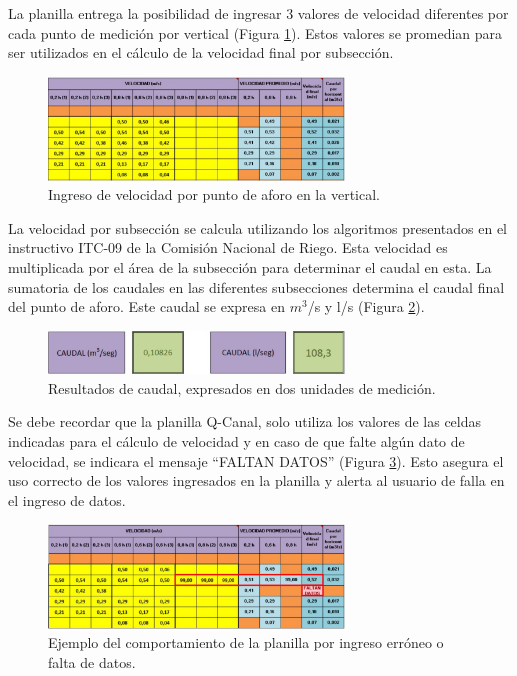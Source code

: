 \documentclass[]{article}
\begin{document}
La planilla entrega la posibilidad de ingresar 3 valores de velocidad diferentes por cada punto de medición por vertical (Figura \ref{ing_veloc}). Estos valores se promedian para ser utilizados en el cálculo de la velocidad final por subsección.

 \begin{figure}[H]
\centering
\includegraphics[width=0.7\textwidth]{images/ingreso_veloc.eps}
\caption{Ingreso de velocidad por punto de aforo en la vertical.}
\label{ing_veloc}
\end{figure}

La velocidad por subsección se calcula utilizando los algoritmos presentados en el instructivo ITC-09 de la Comisión Nacional de Riego. Esta velocidad es multiplicada por el área de la subsección para determinar el caudal en esta. La sumatoria de los caudales en las diferentes subsecciones determina el caudal final del punto de aforo. Este caudal se expresa en $m^3$/s y l/s (Figura \ref{res_q}).\\

\begin{figure}[H]
\centering
\includegraphics[width=0.7\textwidth]{images/caudal.eps}
\caption{Resultados de caudal, expresados en dos unidades de medición.}
\label{res_q}
\end{figure}

Se debe recordar que la planilla Q-Canal, solo utiliza los valores de las celdas indicadas para el cálculo de velocidad y en caso de que falte algún dato de velocidad, se indicara el mensaje “FALTAN DATOS” (Figura \ref{faltan_d}). Esto asegura el uso correcto de los valores ingresados en la planilla y alerta al usuario de falla en el ingreso de datos.\\

\begin{figure}[H]
\centering
\includegraphics[width=0.7\textwidth]{images/faltan_datos.eps}
\caption{Ejemplo del comportamiento de la planilla por ingreso erróneo o falta de datos.}
\label{faltan_d}
\end{figure}
\end{document}
